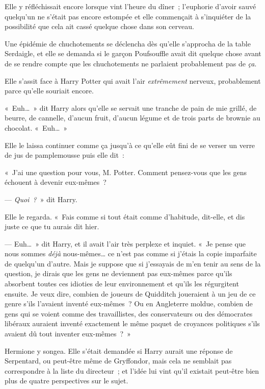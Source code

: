 \later

Elle y réfléchissait encore lorsque vint l'heure du dîner~; l'euphorie d'avoir sauvé quelqu'un ne s'était pas encore estompée et elle commençait à s'inquiéter de la possibilité que cela ait cassé quelque chose dans son cerveau.

Une épidémie de chuchotements se déclencha dès qu'elle s'approcha de la table Serdaigle, et elle se demanda si le garçon Poufsouffle avait dit quelque chose avant de se rendre compte que les chuchotements ne parlaient probablement pas de \emph{ça}.

Elle s'assit face à Harry Potter qui avait l'air \emph{extrêmement} nerveux, probablement parce qu'elle souriait encore.

«~Euh…~» dit Harry alors qu'elle se servait une tranche de pain de mie grillé, de beurre, de cannelle, d'aucun fruit, d'aucun légume et de trois parts de brownie au chocolat.
«~Euh…~»

Elle le laissa continuer comme ça jusqu'à ce qu'elle eût fini de se verser un verre de jus de pamplemousse puis elle dit~:

«~J'ai une question pour vous, M. Potter.
Comment pensez-vous que les gens échouent à devenir eux-mêmes~?

--- \emph{Quoi~?}~» dit Harry.

Elle le regarda.
«~Fais comme si tout était comme d'habitude, dit-elle, et dis juste ce que tu aurais dit hier.

--- Euh…~»
dit Harry, et il avait l'air très perplexe et inquiet.
«~Je pense que nous sommes \emph{déjà} nous-mêmes… ce n'est pas comme si j'étais la copie imparfaite de quelqu'un d'autre.
Mais je suppose que si j'essayais de m'en tenir au sens de la question, je dirais que les gens ne deviennent pas eux-mêmes parce qu'ils absorbent toutes ces idioties de leur environnement et qu'ils les régurgitent ensuite.
Je veux dire, combien de joueurs de Quidditch joueraient à un jeu de ce genre s'ils l'avaient inventé eux-mêmes~?
Ou en Angleterre moldue, combien de gens qui se voient comme des travaillistes, des conservateurs ou des démocrates libéraux auraient inventé exactement le même paquet de croyances politiques s'ils avaient dû tout inventer eux-mêmes~?~»

Hermione y songea.
Elle s'était demandée si Harry aurait une réponse de Serpentard, ou peut-être même de Gryffondor, mais cela ne semblait pas correspondre à la liste du directeur~; et l'idée lui vint qu'il existait peut-être bien plus de quatre perspectives sur le sujet.

